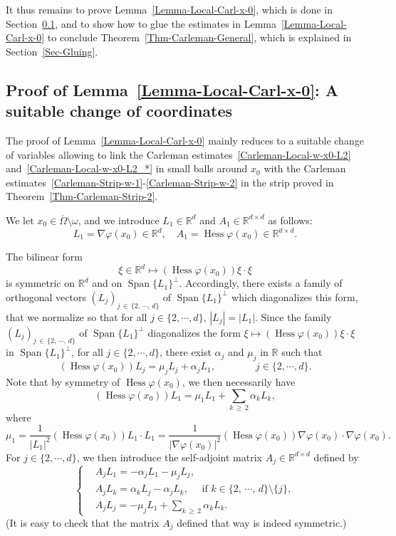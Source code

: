 \documentclass[10pt]{amsart}
\theoremstyle{definition}\newtheorem{defi}[theo]{Definition}\newtheorem{rema}[theo]{Remark}\newtheorem{exam}[theo]{Example}\newtheorem{exem}[theo]{Example}\newtheorem{nota}[theo]{Notation}
\newcommand*\R{\mathbb{R}}
\newcommand*\ds{\displaystyle}
\renewcommand{\geq}{\geqslant}
\DeclareMathOperator{\Hess}{Hess}
\DeclareMathOperator{\Span}{Span}
\begin{document}
It thus remains to prove Lemma~\ref{Lemma-Local-Carl-x-0}, which is done in Section~\ref{Subsec-Proof-Local-Carl}, and to show how to glue the estimates in Lemma~\ref{Lemma-Local-Carl-x-0} to conclude Theorem~\ref{Thm-Carleman-General}, which is explained in Section~\ref{Sec-Gluing}.

\subsection{Proof of Lemma~\ref{Lemma-Local-Carl-x-0}: A suitable change of coordinates}\label{Subsec-Proof-Local-Carl}

The proof of Lemma~\ref{Lemma-Local-Carl-x-0} mainly reduces to a suitable change of variables allowing to link the Carleman estimates~\eqref{Carleman-Local-w-x0-L2} and~\eqref{Carleman-Local-w-x0-L2_*} in small balls around $x_0$ with the Carleman estimates~\eqref{Carleman-Strip-w-1}-\eqref{Carleman-Strip-w-2} in the strip proved in Theorem~\ref{Thm-Carleman-Strip-2}.

We let $x_0 \in \overline\Omega\setminus \omega$, and we introduce $L_1 \in \R^d$ and $A_1 \in \R^{d\times d}$ as follows:
\begin{equation*}
L_1 = \nabla \varphi(x_0) \in \R^d, \quad A_1 = \Hess \varphi(x_0) \in \R^{d\times d}.
\end{equation*}

The bilinear form
\[
\xi \in \R^d \mapsto (\Hess \varphi(x_0)) \xi \cdot \xi
\]
is symmetric on $\R^d$ and on $\Span \{L_1\}^\perp$. Accordingly, there exists a family of orthogonal vectors $(L_j)_{j\,\in\, \{2,\,\cdots,\,d\}} $ of $\Span \{L_1\}^\perp$ which diagonalizes this form, that we normalize so that for all $j \in \{2, \cdots, d\}$, $|L_j | = |L_1|$. Since the family $(L_j)_{j\, \in\,\{2,\, \cdots,\, d\} } $ of $\Span \{L_1\}^\perp$ diagonalizes the form $\xi \mapsto (\Hess \varphi(x_0)) \xi \cdot \xi$ in $\Span \{L_1\}^\perp$, for all $j \in \{2, \cdots, d\}$, there exist $\alpha_j $ and $\mu_j$ in $\R$ such that
\[
(\Hess \varphi(x_0)) L_j = \mu_j L_j + \alpha_j L_1, \qquad \qquad j \in \{2, \cdots, d\}.
\]
Note that by symmetry of $\Hess \varphi(x_0)$, we then necessarily have
\[
(\Hess \varphi(x_0)) L_1 = \mu_1 L_1 + \sum_{k\,\geq\,2} \alpha_k L_k,
\]
where
\[
\mu_1 = \frac{1}{|L_1|^2} (\Hess \varphi(x_0)) L_1 \cdot L_1 =
\frac{1}{|\nabla \varphi(x_0)|^2} (\Hess \varphi(x_0)) \nabla \varphi(x_0) \cdot \nabla \varphi(x_0).
\]
For $j \in \{2, \cdots, d\}$, we then introduce the self-adjoint matrix $A_j \in \R^{d \times d}$ defined by
\begin{equation}\label{Choices-A-j}
\left\{
\begin{array}{ll}
& \ds A_j L_1 = - \alpha_j L_1 - \mu_j L_j,
\\
& \ds A_j L_k = \alpha_k L_j - \alpha_j L_k, \quad \text{ if } k \in \{2,\, \cdots,\, d\}\setminus \{ j\},
\\
& \ds A_j L_j = - \mu_j L_1 + \sum_{k\,\geq\, 2} \alpha_k L_k.
\end{array}
\right.
\end{equation}
(It is easy to check that the matrix $A_j$ defined that way is indeed symmetric.)
\end{document}
